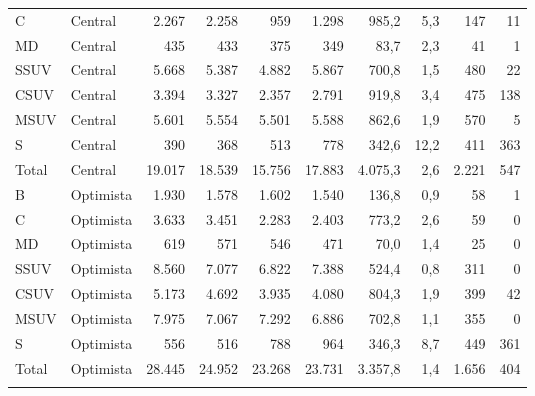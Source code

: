 \begin{longtable}{@{}llrrrrrrrr@{}}
C & Central & 2.267 & 2.258 & 959 & 1.298 & 985,2 & 5,3 & 147 & 11 \\
MD & Central & 435 & 433 & 375 & 349 & 83,7 & 2,3 & 41 & 1 \\
SSUV & Central & 5.668 & 5.387 & 4.882 & 5.867 & 700,8 & 1,5 & 480 & 22 \\
CSUV & Central & 3.394 & 3.327 & 2.357 & 2.791 & 919,8 & 3,4 & 475 & 138 \\
MSUV & Central & 5.601 & 5.554 & 5.501 & 5.588 & 862,6 & 1,9 & 570 & 5 \\
S & Central & 390 & 368 & 513 & 778 & 342,6 & 12,2 & 411 & 363 \\
\rowcolor{fondo}
Total & Central & 19.017 & 18.539 & 15.756 & 17.883 & 4.075,3 & 2,6 & 2.221 & 547 \\
\addlinespace[5pt]
B & Optimista & 1.930 & 1.578 & 1.602 & 1.540 & 136,8 & 0,9 & 58 & 1 \\
C & Optimista & 3.633 & 3.451 & 2.283 & 2.403 & 773,2 & 2,6 & 59 & 0 \\
MD & Optimista & 619 & 571 & 546 & 471 & 70,0 & 1,4 & 25 & 0 \\
SSUV & Optimista & 8.560 & 7.077 & 6.822 & 7.388 & 524,4 & 0,8 & 311 & 0 \\
CSUV & Optimista & 5.173 & 4.692 & 3.935 & 4.080 & 804,3 & 1,9 & 399 & 42 \\
MSUV & Optimista & 7.975 & 7.067 & 7.292 & 6.886 & 702,8 & 1,1 & 355 & 0 \\
S & Optimista & 556 & 516 & 788 & 964 & 346,3 & 8,7 & 449 & 361 \\
\rowcolor{fondo}
Total & Optimista & 28.445 & 24.952 & 23.268 & 23.731 & 3.357,8 & 1,4 & 1.656 & 404 \\
\addlinespace[5pt]
\end{longtable}
\clearpage
